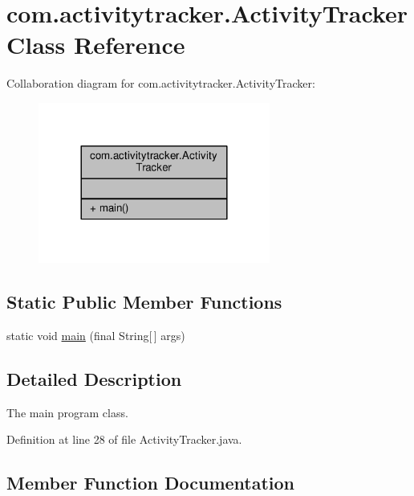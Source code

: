 \hypertarget{classcom_1_1activitytracker_1_1_activity_tracker}{}\section{com.\+activitytracker.\+Activity\+Tracker Class Reference}
\label{classcom_1_1activitytracker_1_1_activity_tracker}


Collaboration diagram for com.\+activitytracker.\+Activity\+Tracker\+:
\nopagebreak
\begin{figure}[H]
\begin{center}
\leavevmode
\includegraphics[width=216pt]{classcom_1_1activitytracker_1_1_activity_tracker__coll__graph}
\end{center}
\end{figure}
\subsection*{Static Public Member Functions}
\begin{DoxyCompactItemize}
\item 
static void \hyperlink{classcom_1_1activitytracker_1_1_activity_tracker_a29cfd2975a07afe34e2a3112cbf32dc8}{main} (final String\mbox{[}$\,$\mbox{]} args)
\end{DoxyCompactItemize}


\subsection{Detailed Description}
The main program class. 

Definition at line 28 of file Activity\+Tracker.\+java.



\subsection{Member Function Documentation}
